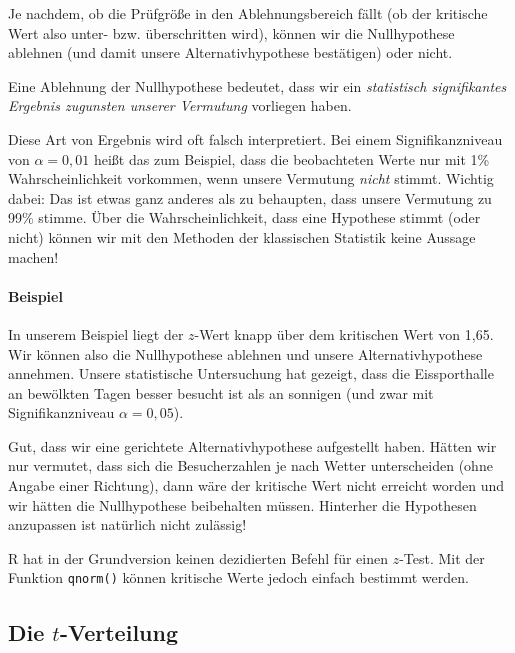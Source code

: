 \documentclass[
  ngerman,
]{article}
\begin{document}
Je nachdem, ob die Prüfgröße in den Ablehnungsbereich fällt (ob der kritische Wert also unter- bzw. überschritten wird), können wir die Nullhypothese ablehnen (und damit unsere Alternativhypothese bestätigen) oder nicht.

Eine Ablehnung der Nullhypothese bedeutet, dass wir ein \emph{statistisch signifikantes Ergebnis zugunsten unserer Vermutung} vorliegen haben.

Diese Art von Ergebnis wird oft falsch interpretiert. Bei einem Signifikanzniveau von \(\alpha=0{,}01\) heißt das zum Beispiel, dass die beobachteten Werte nur mit 1\% Wahrscheinlichkeit vorkommen, wenn unsere Vermutung \emph{nicht} stimmt. Wichtig dabei: Das ist etwas ganz anderes als zu behaupten, dass unsere Vermutung zu 99\% stimme. Über die Wahrscheinlichkeit, dass eine Hypothese stimmt (oder nicht) können wir mit den Methoden der klassischen Statistik keine Aussage machen!

\hypertarget{beispiel-5}{%
\paragraph{Beispiel}\label{beispiel-5}}

In unserem Beispiel liegt der \(z\)-Wert knapp über dem kritischen Wert von 1,65. Wir können also die Nullhypothese ablehnen und unsere Alternativhypothese annehmen. Unsere statistische Untersuchung hat gezeigt, dass die Eissporthalle an bewölkten Tagen besser besucht ist als an sonnigen (und zwar mit Signifikanzniveau \(\alpha=0,05\)).

Gut, dass wir eine gerichtete Alternativhypothese aufgestellt haben. Hätten wir nur vermutet, dass sich die Besucherzahlen je nach Wetter unterscheiden (ohne Angabe einer Richtung), dann wäre der kritische Wert nicht erreicht worden und wir hätten die Nullhypothese beibehalten müssen. Hinterher die Hypothesen anzupassen ist natürlich nicht zulässig!

\begin{rtip}
R hat in der Grundversion keinen dezidierten Befehl für einen $z$-Test. Mit der Funktion {\tt qnorm()} können kritische Werte jedoch einfach bestimmt werden.
\end{rtip}

\hypertarget{die-t-verteilung}{%
\subsection{\texorpdfstring{Die \(t\)-Verteilung}{Die t-Verteilung}}\label{die-t-verteilung}}
\end{document}
